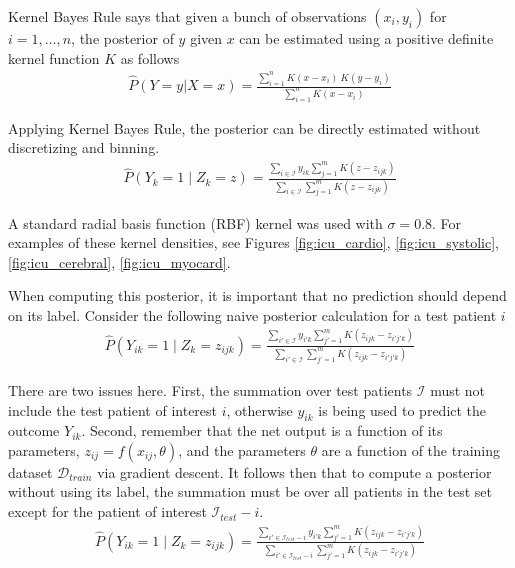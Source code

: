 Kernel Bayes Rule says that given a bunch of observations $(x_i, y_i)$ for $i = 1, \dots, n$, the posterior of $y$ given $x$ can be estimated using a positive definite kernel function $K$ as follows
\begin{gather}
    \hat{P}(Y = y | X = x) = \frac
        {\sum_{i=1}^n K(x - x_i) \ K(y - y_i)}
        {\sum_{i=1}^n K(x - x_i)}
\end{gather}

Applying Kernel Bayes Rule, the posterior can be directly estimated without discretizing and binning.
\begin{gather}
    \hat{P}(Y_k = 1 \mid Z_k = z) = \frac
        {\sum_{i \in \mathcal{I}} y_{ik} \sum_{j=1}^m K(z - z_{ijk})}
        {\sum_{i \in \mathcal{I}} \sum_{j=1}^m K(z - z_{ijk})}
\end{gather}

A standard radial basis function (RBF) kernel was used with $\sigma = 0.8$.  For examples of these kernel densities, see Figures \ref{fig:icu_cardio}, \ref{fig:icu_systolic}, \ref{fig:icu_cerebral}, \ref{fig:icu_myocard}.

When computing this posterior, it is important that no prediction should depend on its label.  Consider the following naive posterior calculation for a test patient $i$
\begin{gather}
    \hat{P}(Y_{ik} = 1 \mid Z_k = z_{ijk}) = \frac
        {\sum_{i' \in \mathcal{I}} y_{i'k} \sum_{j'=1}^m K(z_{ijk} - z_{i'j'k})}
        {\sum_{i' \in \mathcal{I}} \sum_{j'=1}^m K(z_{ijk} - z_{i'j'k})}
\end{gather}

There are two issues here.  First, the summation over test patients $\mathcal{I}$ must not include the test patient of interest $i$, otherwise $y_{ik}$ is being used to predict the outcome $Y_{ik}$.  Second, remember that the net output is a function of its parameters, $z_{ij} = f(x_{ij}, \theta)$, and the parameters $\theta$ are a function of the training dataset $\mathcal{D}_{train}$ via gradient descent.  It follows then that to compute a posterior without using its label, the summation must be over all patients in the test set except for the patient of interest $\mathcal{I}_{test} - i$.
\begin{gather}
    \hat{P}(Y_{ik} = 1 \mid Z_k = z_{ijk}) = \frac
        {\sum_{i' \in \mathcal{I}_{test} - i} y_{i'k} \sum_{j'=1}^m K(z_{ijk} - z_{i'j'k})}
        {\sum_{i' \in \mathcal{I}_{test} - i} \sum_{j'=1}^m K(z_{ijk} - z_{i'j'k})}
\end{gather}

